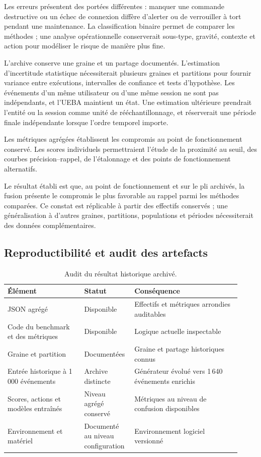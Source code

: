 \documentclass[11pt,a4paper,oneside]{report}
\theoremstyle{definition}
\theoremstyle{plain}
\begin{document}
Les erreurs présentent des portées différentes : manquer une commande
destructive ou un échec de connexion diffère d'alerter ou de verrouiller à tort
pendant une maintenance. La classification binaire permet de comparer les
méthodes ; une analyse opérationnelle conserverait sous-type, gravité, contexte
et action pour modéliser le risque de manière plus fine.

L'archive conserve une graine et un partage documentés. L'estimation
d'incertitude statistique nécessiterait plusieurs graines et partitions pour
fournir variance entre exécutions, intervalles de confiance et tests
d'hypothèse. Les événements d'un même utilisateur ou d'une même session ne sont
pas indépendants, et l'UEBA maintient un état. Une estimation ultérieure
prendrait l'entité ou la session comme unité de rééchantillonnage, et
réserverait une période finale indépendante lorsque l'ordre temporel importe.

Les métriques agrégées établissent les compromis au point de fonctionnement
conservé. Les scores individuels permettraient l'étude de la proximité au seuil,
des courbes précision--rappel, de l'étalonnage et des points de fonctionnement
alternatifs.

Le résultat établi est que, au point de fonctionnement et sur le pli archivés,
la fusion présente le compromis le plus favorable au rappel parmi les méthodes
comparées. Ce constat est réplicable à partir des effectifs conservés ; une
généralisation à d'autres graines, partitions, populations et périodes
nécessiterait des données complémentaires.


\subsection{Reproductibilité et audit des artefacts}
\label{sec:validation-reproducibility}

\begin{table}[tb]
  \centering
  \caption{Audit du résultat historique archivé.}
  \label{tab:eval-repro-audit}
  \small
  \begin{tabular}{@{}p{0.31\linewidth}p{0.18\linewidth}p{0.43\linewidth}@{}}
    \toprule
    Élément & Statut & Conséquence \\
    \midrule
    JSON agrégé & Disponible &
    Effectifs et métriques arrondies auditables \\
    Code du benchmark et des métriques & Disponible &
    Logique actuelle inspectable \\
    Graine et partition & Documentées &
    Graine et partage historiques connus \\
    Entrée historique à 1\,000 événements & Archive distincte &
    Générateur évolué vers 1\,640 événements enrichis \\
    Scores, actions et modèles entraînés & Niveau agrégé conservé &
    Métriques au niveau de confusion disponibles \\
    Environnement et matériel & Documenté au niveau configuration &
    Environnement logiciel versionné \\
    \bottomrule
  \end{tabular}
\end{table}
\end{document}
